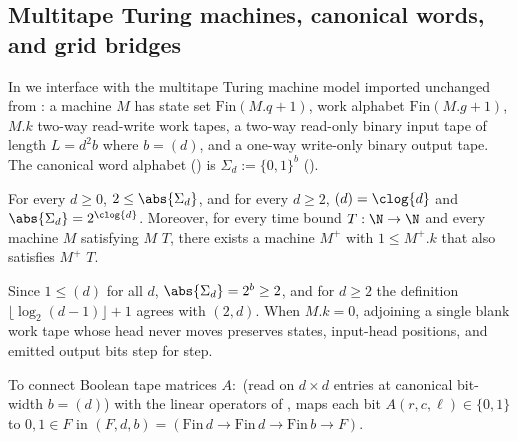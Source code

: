 \subsection{Multitape Turing machines, canonical words, and grid bridges}\label{sec:defs-tm}

In  we interface with the multitape Turing machine model
 imported unchanged from \cite[Sections~2.1--2.2 and Definition~2.1]{FirstPaper2026}:
a machine $M$ has state set $\mathrm{Fin}(M.q + 1)$, work alphabet $\mathrm{Fin}(M.g + 1)$, $M.k$
two-way read-write work tapes, a two-way read-only binary input tape of length $L = d^2 b$ where
$b = {}$$(d)$, and a one-way write-only binary output tape. The canonical
word alphabet () is $\Sigma_d := \{0,1\}^b$
().

\begin{lemma}\label{lem:pad-dummy-tape}
For every $d \ge 0$, $2 \le \abs{\Sigma_d}$, and for every $d \ge 2$,
$(d) = \clog{d}$ and $\abs{\Sigma_d} = 2^{\clog{d}}$. Moreover, for
every time bound $T : \N \to \N$ and every machine $M$ satisfying
 $M$ $T$, there exists a machine $M^+$ with $1 \le M^+.k$ that
also satisfies  $M^+$ $T$.
\end{lemma}
\begin{outline}
Since $1 \le {}$$(d)$ for all $d$, $\abs{\Sigma_d} = 2^b \ge 2$, and for
$d \ge 2$ the definition $\lfloor\log_2(d-1)\rfloor + 1$ agrees with $(2, d)$.
When $M.k = 0$, adjoining a single blank work tape whose head never moves preserves states,
input-head positions, and emitted output bits step for step.
\end{outline}

To connect Boolean tape matrices $A : {}$ (read on $d \times d$ entries at
canonical bit-width $b = {}$$(d)$) with the linear operators of
,  maps each bit $A(r,c,\ell) \in \{0,1\}$ to $0,1 \in F$
in $(F, d, b) = (\mathrm{Fin}\,d \to \mathrm{Fin}\,d \to \mathrm{Fin}\,b \to F)$.

